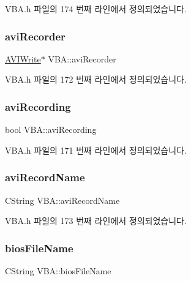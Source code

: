V\+B\+A.\+h 파일의 174 번째 라인에서 정의되었습니다.

\mbox{\label{class_v_b_a_a761be1e36182d12710a199a50c0df020}} 
\subsubsection{\texorpdfstring{avi\+Recorder}{aviRecorder}}
{\footnotesize\ttfamily \mbox{\hyperlink{class_a_v_i_write}{A\+V\+I\+Write}}$\ast$ V\+B\+A\+::avi\+Recorder}



V\+B\+A.\+h 파일의 172 번째 라인에서 정의되었습니다.

\mbox{\label{class_v_b_a_a96743b6c6ee2d9b45c52b981136e3738}} 
\subsubsection{\texorpdfstring{avi\+Recording}{aviRecording}}
{\footnotesize\ttfamily bool V\+B\+A\+::avi\+Recording}



V\+B\+A.\+h 파일의 171 번째 라인에서 정의되었습니다.

\mbox{\label{class_v_b_a_a62ff0f88b2380de18a1412783c8d9959}} 
\subsubsection{\texorpdfstring{avi\+Record\+Name}{aviRecordName}}
{\footnotesize\ttfamily C\+String V\+B\+A\+::avi\+Record\+Name}



V\+B\+A.\+h 파일의 173 번째 라인에서 정의되었습니다.

\mbox{\label{class_v_b_a_a7bc70f5f75c0e2e3e2b1b63411af4559}} 
\subsubsection{\texorpdfstring{bios\+File\+Name}{biosFileName}}
{\footnotesize\ttfamily C\+String V\+B\+A\+::bios\+File\+Name}



